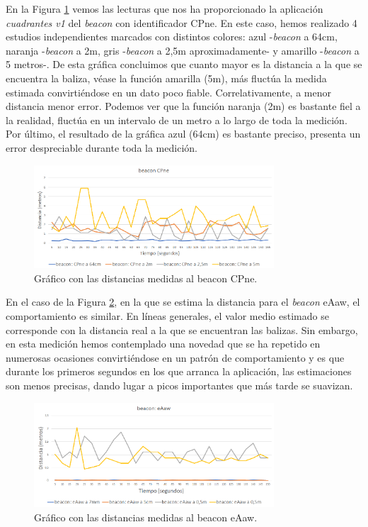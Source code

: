 En la Figura \ref{fig:dist_CPne} vemos las lecturas que nos ha proporcionado la aplicación \textit{cuadrantes v1} del \textit{beacon} con identificador CPne. En este caso, hemos realizado 4 estudios independientes marcados con distintos colores: azul -\textit{beacon} a 64cm, naranja -\textit{beacon} a 2m, gris -\textit{beacon} a 2,5m aproximadamente- y amarillo -\textit{beacon} a 5 metros-. De esta gráfica concluimos que cuanto mayor es la distancia a la que se encuentra la baliza, véase la función amarilla (5m), más fluctúa la medida estimada convirtiéndose en un dato poco fiable. Correlativamente, a menor distancia menor error. Podemos ver que la función naranja (2m) es bastante fiel a la realidad, fluctúa en un intervalo de un metro a lo largo de toda la medición. Por último, el resultado de la gráfica azul (64cm) es bastante preciso, presenta un error despreciable durante toda la medición.

\begin{figure}[t]
	\centering
	\includegraphics[width=0.8\textwidth]{Imagenes/Descripciondeltrabajo/dist_CPne}
	\caption{Gráfico con las distancias medidas al beacon CPne. }
	\label{fig:dist_CPne}
\end{figure}

En el caso de la Figura \ref{fig:dist_eAaw}, en la que se estima la distancia para el \textit{beacon} eAaw, el comportamiento es similar. En líneas generales, el valor medio estimado se corresponde con la distancia real a la que se encuentran las balizas. Sin embargo, en esta medición hemos contemplado una novedad que se ha repetido en numerosas ocasiones convirtiéndose en un patrón de comportamiento y es que durante los primeros segundos en los que arranca la aplicación, las estimaciones son menos precisas, dando lugar a picos importantes que más tarde se suavizan. 
\begin{figure}[t]
	\centering
	\includegraphics[width=0.8\textwidth]{Imagenes/Descripciondeltrabajo/dist_eAaw}
	\caption{Gráfico con las distancias medidas al beacon eAaw. }
	\label{fig:dist_eAaw}
\end{figure}

